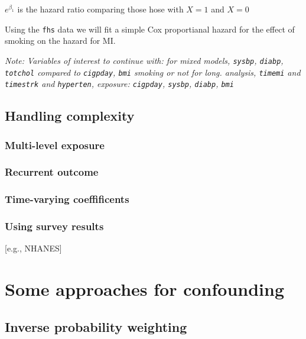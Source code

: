 \documentclass[
]{book}
\begin{document}
\(e^{\beta_{1}}\) is the hazard ratio comparing those hose with \(X=1\) and \(X=0\)

Using the \texttt{fhs} data we will fit a simple Cox proportianal hazard for the effect of smoking on the hazard for MI.

\emph{Note: Variables of interest to continue with:
for mixed models, \texttt{sysbp}, \texttt{diabp}, \texttt{totchol} compared to \texttt{cigpday}, \texttt{bmi} smoking or not
for long. analysis, \texttt{timemi} and \texttt{timestrk} and \texttt{hyperten}, exposure: \texttt{cigpday}, \texttt{sysbp}, \texttt{diabp}, \texttt{bmi}}

\hypertarget{handling-complexity}{%
\section{Handling complexity}\label{handling-complexity}}

\hypertarget{multi-level-exposure}{%
\subsection{Multi-level exposure}\label{multi-level-exposure}}

\hypertarget{recurrent-outcome}{%
\subsection{Recurrent outcome}\label{recurrent-outcome}}

\hypertarget{time-varying-coeffificents}{%
\subsection{Time-varying coeffificents}\label{time-varying-coeffificents}}

\hypertarget{using-survey-results}{%
\subsection{Using survey results}\label{using-survey-results}}

{[}e.g., NHANES{]}

\hypertarget{some-approaches-for-confounding}{%
\chapter{Some approaches for confounding}\label{some-approaches-for-confounding}}

\hypertarget{inverse-probability-weighting}{%
\section{Inverse probability weighting}\label{inverse-probability-weighting}}
\end{document}
